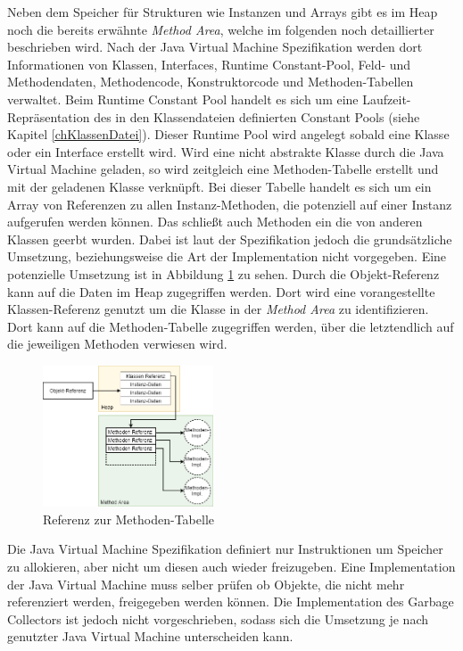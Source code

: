\documentclass[conference]{IEEEtran}
\begin{document}
Neben dem Speicher für Strukturen wie Instanzen und Arrays gibt es im Heap noch die bereits erwähnte \textit{Method Area}, welche im folgenden noch detaillierter beschrieben wird. Nach der Java Virtual Machine Spezifikation werden dort Informationen von Klassen, Interfaces, Runtime Constant-Pool, Feld- und Methodendaten, Methodencode, Konstruktorcode und Methoden-Tabellen verwaltet. Beim Runtime Constant Pool handelt es sich um eine Laufzeit-Repräsentation des in den Klassendateien definierten Constant Pools (siehe Kapitel \ref{chKlassenDatei}). Dieser Runtime Pool wird angelegt sobald eine Klasse oder ein Interface erstellt wird. Wird eine nicht abstrakte Klasse durch die Java Virtual Machine geladen, so wird zeitgleich eine Methoden-Tabelle erstellt und mit der geladenen Klasse verknüpft. Bei dieser Tabelle handelt es sich um ein Array von Referenzen zu allen Instanz-Methoden, die potenziell auf einer Instanz aufgerufen werden können. Das schließt auch Methoden ein die von anderen Klassen geerbt wurden. Dabei ist laut der Spezifikation jedoch die grundsätzliche Umsetzung, beziehungsweise die Art der Implementation nicht vorgegeben. Eine potenzielle Umsetzung ist in Abbildung \ref{fig:linkZurMethodenTabelle} zu sehen. Durch die Objekt-Referenz kann auf die Daten im Heap zugegriffen werden. Dort wird eine vorangestellte Klassen-Referenz genutzt um die Klasse in der \textit{Method Area} zu identifizieren. Dort kann auf die Methoden-Tabelle zugegriffen werden, über die letztendlich auf die jeweiligen Methoden verwiesen wird.
\begin{figure}[htbp] 
  \centering
     \includegraphics[width=0.45\textwidth]{Grafiken/LinkZurMethodenTabelle.png}
  \caption{Referenz zur Methoden-Tabelle}
  \label{fig:linkZurMethodenTabelle}
\end{figure}

Die Java Virtual Machine Spezifikation definiert nur Instruktionen um Speicher zu allokieren, aber nicht um diesen auch wieder freizugeben. Eine Implementation der Java Virtual Machine muss selber prüfen ob Objekte, die nicht mehr referenziert werden, freigegeben werden können. Die Implementation des Garbage Collectors ist jedoch nicht vorgeschrieben, sodass sich die Umsetzung je nach genutzter Java Virtual Machine unterscheiden kann. \cite{Venners.1999} 
\end{document}
